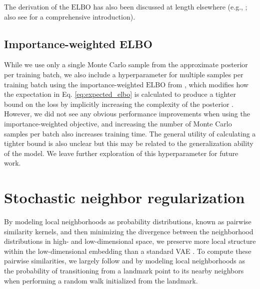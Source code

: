 The derivation of the $\mathrm{ELBO}$ has also been discussed at length elsewhere (e.g., \citealt{kingma2013vae, kingma2014semi, burda2015iwae, alemi2016deep, dilokthanakul2016gmvae, alemi2017fixing, ding2018scvis}; also see \citealt{kingma2019introduction} for a comprehensive introduction).


\subsection{Importance-weighted ELBO}
\label{appendix:iwae}
While we use only a single Monte Carlo sample from the approximate posterior per training batch, we also include a hyperparameter for multiple samples per training batch using the importance-weighted $\mathrm{ELBO}$ from \cite{burda2015iwae}, which modifies how the expectation in Eq. \ref{eq:expected_elbo} is calculated to produce a tighter bound on the loss by implicitly increasing the complexity of the posterior \citep{cremer2017reinterpreting}. However, we did not see any obvious performance improvements when using the importance-weighted objective, and increasing the number of Monte Carlo samples per batch also increases training time. The general utility of calculating a tighter bound is also unclear \citep{rainforth2018tighter} but this may be related to the generalization ability of the model. We leave further exploration of this hyperparameter for future work.

\section{Stochastic neighbor regularization}
\label{appendix:sne}
By modeling local neighborhoods as probability distributions, known as pairwise similarity kernels, and then minimizing the divergence between the neighborhood distributions in high- and low-dimensional space, we preserve more local structure within the low-dimensional embedding than a standard VAE \citep{ding2018scvis}. To compute these pairwise similarities, we largely follow \cite{hinton2003stochastic} and \cite{maaten2008tsne} by modeling local neighborhoods as the probability of transitioning from a landmark point to its nearby neighbors when performing a random walk initialized from the landmark. 

